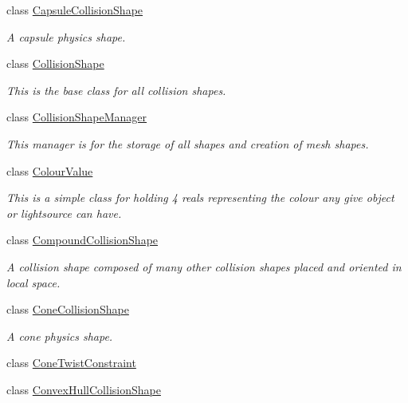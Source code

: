 \begin{DoxyCompactItemize}
class \hyperlink{classphys_1_1CapsuleCollisionShape}{CapsuleCollisionShape}
\begin{DoxyCompactList}\small\item\em A capsule physics shape. \item\end{DoxyCompactList}\item 
class \hyperlink{classphys_1_1CollisionShape}{CollisionShape}
\begin{DoxyCompactList}\small\item\em This is the base class for all collision shapes. \item\end{DoxyCompactList}\item 
class \hyperlink{classphys_1_1CollisionShapeManager}{CollisionShapeManager}
\begin{DoxyCompactList}\small\item\em This manager is for the storage of all shapes and creation of mesh shapes. \item\end{DoxyCompactList}\item 
class \hyperlink{classphys_1_1ColourValue}{ColourValue}
\begin{DoxyCompactList}\small\item\em This is a simple class for holding 4 reals representing the colour any give object or lightsource can have. \item\end{DoxyCompactList}\item 
class \hyperlink{classphys_1_1CompoundCollisionShape}{CompoundCollisionShape}
\begin{DoxyCompactList}\small\item\em A collision shape composed of many other collision shapes placed and oriented in local space. \item\end{DoxyCompactList}\item 
class \hyperlink{classphys_1_1ConeCollisionShape}{ConeCollisionShape}
\begin{DoxyCompactList}\small\item\em A cone physics shape. \item\end{DoxyCompactList}\item 
class \hyperlink{classphys_1_1ConeTwistConstraint}{ConeTwistConstraint}
\item 
class \hyperlink{classphys_1_1ConvexHullCollisionShape}{ConvexHullCollisionShape}

\end{DoxyCompactItemize}
